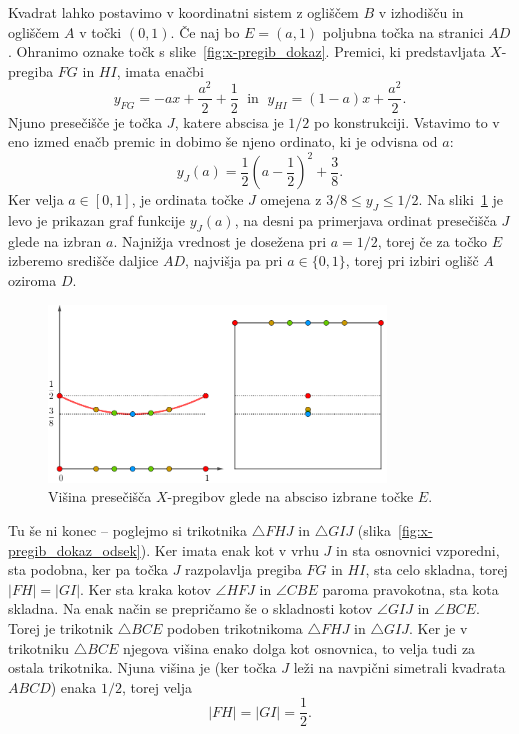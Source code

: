 Kvadrat lahko postavimo v koordinatni sistem z ogliščem $B$ v izhodišču in ogliščem $A$ v točki $(0,1)$. Če naj bo $E = (a, 1)$ poljubna točka na stranici $AD$. Ohranimo oznake točk s slike~\ref{fig:x-pregib_dokaz}. Premici, ki predstavljata $X$-pregiba $FG$ in $HI$, imata enačbi
$$ y_{FG} = -ax + \frac{a^2}{2} + \frac{1}{2} \; \text{ in } \; y_{HI} = (1-a)x + \frac{a^2}{2}. $$
Njuno presečišče je točka $J$, katere abscisa je $1/2$ po konstrukciji. Vstavimo to v eno izmed enačb premic in dobimo še njeno ordinato, ki je odvisna od $a$:
$$ y_J(a) = \frac{1}{2} \left(a - \frac{1}{2}\right)^2 + \frac{3}{8}. $$
Ker velja $a \in [0,1]$, je ordinata točke $J$ omejena z $3/8 \leq y_J \leq 1/2$. Na sliki~\ref{fig:x-pregib_visina_pres} je levo je prikazan graf funkcije $y_J(a)$, na desni pa primerjava ordinat presečišča $J$ glede na izbran $a$. Najnižja vrednost je dosežena pri $a = 1/2$, torej če za točko $E$ izberemo središče daljice $AD$, najvišja pa pri $a \in \{0, 1\}$, torej pri izbiri oglišč $A$ oziroma $D$.
\begin{figure}[h]
    \centering
    \includegraphics[width=0.8\textwidth]{images/x-pregibi/visina_presecisca.png}
    \caption[Višina presečišča $X$-pregibov]{Višina presečišča $X$-pregibov glede na absciso izbrane točke $E$.}
    \label{fig:x-pregib_visina_pres}
\end{figure}

Tu še ni konec -- poglejmo si trikotnika $\triangle FHJ$ in $\triangle GIJ$ (slika~\ref{fig:x-pregib_dokaz_odsek}). Ker imata enak kot v vrhu $J$ in sta osnovnici vzporedni, sta podobna, ker pa točka $J$ razpolavlja pregiba $FG$ in $HI$, sta celo skladna, torej $|FH| = |GI|$. Ker sta kraka kotov $\angle HFJ$ in $\angle CBE$ paroma pravokotna, sta kota skladna. Na enak način se prepričamo še o skladnosti kotov $\angle GIJ$ in $\angle BCE$. Torej je trikotnik $\triangle BCE$ podoben trikotnikoma $\triangle FHJ$ in $\triangle GIJ$. Ker je v trikotniku $\triangle BCE$ njegova višina enako dolga kot osnovnica, to velja tudi za ostala trikotnika. Njuna višina je (ker točka $J$ leži na navpični simetrali kvadrata $ABCD$) enaka $1/2$, torej velja
$$ |FH| = |GI| = \frac{1}{2}. $$

